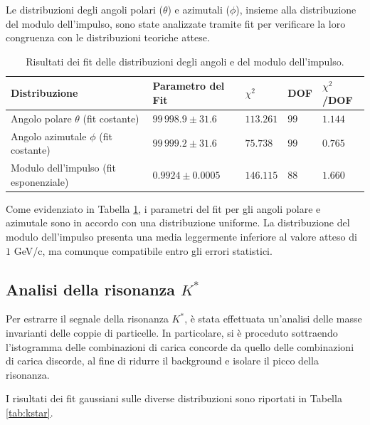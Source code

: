 \documentclass[a4paper,11pt]{article}
\begin{document}
Le distribuzioni degli angoli polari ($\theta$) e azimutali ($\phi$), insieme alla distribuzione del modulo dell'impulso, sono state analizzate tramite fit per verificare la loro congruenza con le distribuzioni teoriche attese.

\begin{table}[h!]
    \centering
    \begin{tabular}{|m{3cm}|>{\centering\arraybackslash}m{3cm}|>{\centering\arraybackslash}m{1.5cm}|>{\centering\arraybackslash}m{1.5cm}|>{\centering\arraybackslash}m{1.5cm}|}
        \hline
        \textbf{Distribuzione} & \textbf{Parametro del Fit} & $\chi^2$ & \textbf{DOF} & $\chi^2$/DOF \\
        \hline
        Angolo polare $\theta$ (fit costante) & $99\,998.9 \pm 31.6$ & $113.261$ & $99$ & $1.144$ \\
        \hline
        Angolo azimutale $\phi$ (fit costante) & $99\,999.2 \pm 31.6$ & $75.738$ & $99$ & $0.765$ \\
        \hline
        Modulo dell'impulso (fit esponenziale) & $0.9924 \pm 0.0005$ & $146.115$ & $88$ & $1.660$ \\
        \hline
    \end{tabular}
    \caption{Risultati dei fit delle distribuzioni degli angoli e del modulo dell'impulso.}
    \label{tab:distribuzioni}
\end{table}

Come evidenziato in Tabella \ref{tab:distribuzioni}, i parametri del fit per gli angoli polare e azimutale sono in accordo con una distribuzione uniforme. La distribuzione del modulo dell'impulso presenta una media leggermente inferiore al valore atteso di $1$ GeV/c, ma comunque compatibile entro gli errori statistici.

\subsection{Analisi della risonanza \( K^* \)}

Per estrarre il segnale della risonanza \( K^* \), è stata effettuata un'analisi delle masse invarianti delle coppie di particelle. In particolare, si è proceduto sottraendo l'istogramma delle combinazioni di carica concorde da quello delle combinazioni di carica discorde, al fine di ridurre il background e isolare il picco della risonanza.

I risultati dei fit gaussiani sulle diverse distribuzioni sono riportati in Tabella \ref{tab:kstar}.
\end{document}
